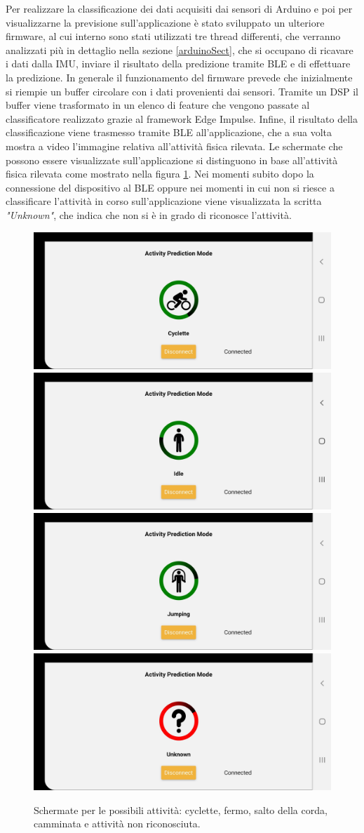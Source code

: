 Per realizzare la classificazione dei dati acquisiti dai sensori di Arduino e poi per visualizzarne la previsione sull'applicazione è stato sviluppato un ulteriore firmware, al cui interno sono stati utilizzati tre thread differenti, che verranno analizzati più in dettaglio nella sezione \ref{arduinoSect}, che si occupano di ricavare i dati dalla IMU, inviare il risultato della predizione tramite BLE e di effettuare la predizione. In generale il funzionamento del firmware prevede che inizialmente si riempie un buffer circolare con i dati provenienti dai sensori. Tramite un DSP il buffer viene trasformato in un elenco di feature che vengono passate al classificatore realizzato grazie al framework Edge Impulse. Infine, il risultato della classificazione viene trasmesso tramite BLE all'applicazione, che a sua volta mostra a video l'immagine relativa all'attività fisica rilevata. Le schermate che possono essere visualizzate sull'applicazione si distinguono in base all'attività fisica rilevata come mostrato nella figura \ref{fig:attivitafisica}. Nei momenti subito dopo la connessione del dispositivo al BLE oppure nei momenti in cui non si riesce a classificare l'attività in corso sull'applicazione viene visualizzata la scritta \textit{"Unknown"}, che indica che non si è in grado di riconosce l'attività.
\begin{figure}[tbh]
	\centering
	\includegraphics[width=0.4\linewidth]{./ImageFiles/cyclette}
	\includegraphics[width=0.4\linewidth]{./ImageFiles/idle}
	\includegraphics[width=0.4\linewidth]{./ImageFiles/jumping}
	\includegraphics[width=0.4\linewidth]{./ImageFiles/unknown}
	\caption{Schermate per le possibili attività: cyclette, fermo, salto della corda, camminata e attività non riconosciuta.}
	\label{fig:attivitafisica}
\end{figure}

